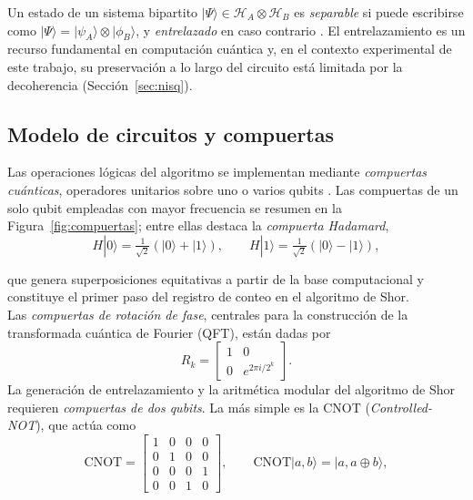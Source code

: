 \documentclass[12pt, spanish]{book}
\begin{document}
Un estado de un sistema bipartito $|\Psi\rangle \in \mathcal{H}_A \otimes \mathcal{H}_B$ es \textit{separable} si puede escribirse como $|\Psi\rangle = |\psi_A\rangle \otimes |\phi_B\rangle$, y \textit{entrelazado} en caso contrario \cite{Nielsen2024}. El entrelazamiento es un recurso fundamental en computación cuántica y, en el contexto experimental de este trabajo, su preservación a lo largo del circuito está limitada por la decoherencia (Sección~\ref{sec:nisq}).
 
\subsection{Modelo de circuitos y compuertas}
\label{sec:modelo_circuitos}
 
Las operaciones lógicas del algoritmo se implementan mediante \textit{compuertas cuánticas}, operadores unitarios sobre uno o varios qubits \cite{Nielsen2024}. Las compuertas de un solo qubit empleadas con mayor frecuencia se resumen en la Figura~\ref{fig:compuertas}; entre ellas destaca la \textit{compuerta Hadamard},
\begin{equation}
    H|0\rangle = \tfrac{1}{\sqrt{2}}(|0\rangle+|1\rangle), \qquad H|1\rangle = \tfrac{1}{\sqrt{2}}(|0\rangle-|1\rangle),
    \label{eq:hadamard}
\end{equation}

que genera superposiciones equitativas a partir de la base computacional y constituye el primer paso del registro de conteo en el algoritmo de Shor.\\
 
Las \textit{compuertas de rotación de fase}, centrales para la construcción de la transformada cuántica de Fourier (QFT), están dadas por
\begin{equation}
    R_k = \begin{bmatrix} 1 & 0 \\ 0 & e^{2\pi i/2^k} \end{bmatrix}.
    \label{eq:rotacion_fase}
\end{equation}
La generación de entrelazamiento y la aritmética modular del algoritmo de Shor requieren \textit{compuertas de dos qubits}. La más simple es la CNOT (\textit{Controlled-NOT}), que actúa como
\begin{equation}
    \text{CNOT} = \begin{bmatrix} 1 & 0 & 0 & 0 \\ 0 & 1 & 0 & 0 \\ 0 & 0 & 0 & 1 \\ 0 & 0 & 1 & 0 \end{bmatrix}, \qquad \text{CNOT}|a,b\rangle = |a, a \oplus b\rangle,
    \label{eq:cnot}
\end{equation}
\end{document}
